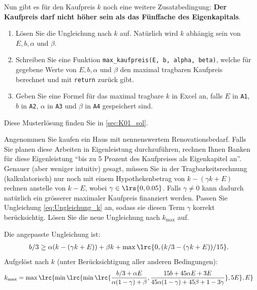 \begin{myexercise}
	Nun gibt es für den Kaufpreis $k$ noch eine weitere Zusatzbedingung: \textbf{Der Kaufpreis darf nicht höher sein als das Fünffache des Eigenkapitals}.

	\begin{enumerate}
		\item Lösen Sie die Ungleichung nach $k$ auf. Natürlich wird $k$ abhängig sein von $E, b, \alpha$ und $\beta$.
		\item Schreiben Sie eine Funktion \lstinline|max_kaufpreis(E, b, alpha, beta)|, welche für gegebene Werte von $E, b, \alpha$ und $\beta$ den maximal tragbaren Kaufpreis berechnet und mit \lstinline|return| zurück gibt.
		\item Geben Sie eine Formel für das maximal tragbare $k$ in Excel an, falls $E$ in \texttt{A1}, $b$ in \texttt{A2}, $\alpha$ in \texttt{A3} und $\beta$ in \texttt{A4} gespeichert sind.
	\end{enumerate}

	\begin{myanswer}
		Diese Musterlösung finden Sie in \cref{sec:K01_sol}.
	\end{myanswer}
\end{myexercise}


\begin{mychallenge}\label{mychallenge:Eigenleistung}
	Angenommen Sie kaufen ein Haus mit nennenswertem Renovationsbedarf. Falls Sie planen diese Arbeiten in Eigenleistung durchzuführen, rechnen Ihnen Banken für diese Eigenleistung \enquote{bis zu 5 Prozent des Kaufpreises als Eigenkapitel an}. Genauer (aber weniger intuitiv) gesagt, müssen Sie in der Tragbarkeitsrechnung (kalkulatorisch) nur noch mit einem Hypothekenbetrag von $k - (\gamma k + E)$ rechnen anstelle von $k - E$, wobei $\gamma\in\lrs{0,0.05}$. Falls $\gamma\neq 0$ kann dadurch natürlich ein grösserer maximaler Kaufpreis finanziert werden. Passen Sie Ungleichung \ref{eq:Ungleichung_k} an, sodass sie diesen Term $\gamma$ korrekt berücksichtig. Lösen Sie die neue Ungleichung nach $k_{\text{max}}$ auf.
	\begin{myanswer}
		Die angepasste Ungleichung ist:
		\begin{align*}
			b / 3 \geq \alpha ( k - (\gamma k + E)) + \beta k + \max\lrc{0, ( k/3 - (\gamma k + E)) / 15}.
		\end{align*}
		Aufgelöst nach $k$ (unter Berücksichtigung aller anderen Bedingungen):
		{\scriptsize
		\begin{align*}
			k_{\text{max}} = \max\lrc{\min\lrc{\min\lrc{\frac{b/3 + \alpha E}{\alpha (1 - \gamma) + \beta}, \frac{15b + 45\alpha E + 3E}{45\alpha (1 - \gamma) + 45\beta + 1 - 3\gamma}}, 5E}, E}
		\end{align*}
		}
	\end{myanswer}
\end{mychallenge}


